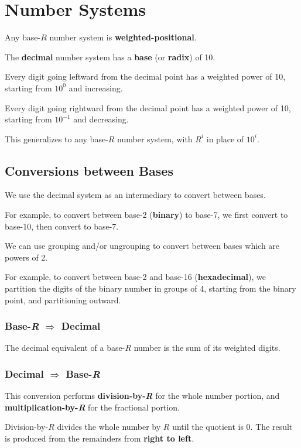\section{Number Systems}
Any base-$R$ number system is \textbf{weighted-positional}.

The \textbf{decimal} number system has a \textbf{base} (or \textbf{radix}) of 10.

Every digit going leftward from the decimal point has a weighted power of 10, starting from $10^0$ and increasing.

Every digit going rightward from the decimal point has a weighted power of 10, starting from $10^{-1}$ and decreasing.

This generalizes to any base-$R$ number system, with $R^i$ in place of $10^i$.

\subsection{Conversions between Bases}
We use the decimal system as an intermediary to convert between bases.

For example, to convert between base-2 (\textbf{binary}) to base-7, we first convert to base-10, then convert to base-7.

We can use grouping and/or ungrouping to convert between bases which are powers of 2.

For example, to convert between base-2 and base-16 (\textbf{hexadecimal}), we partition the digits of the binary
number in groups of 4, starting from the binary point, and partitioning outward.

\subsubsection{Base-\textit{R} $\Rightarrow$ Decimal}
The decimal equivalent of a base-$R$ number is the sum of its weighted digits.

\subsubsection{Decimal $\Rightarrow$ Base-\textit{R}}
This conversion performs \textbf{division-by-\textit{R}} for the whole number portion,
and \textbf{multiplication-by-\textit{R}} for the fractional portion.

Division-by-$R$ divides the whole number by $R$ until the quotient is 0.
The result is produced from the remainders from \textbf{right to left}.

